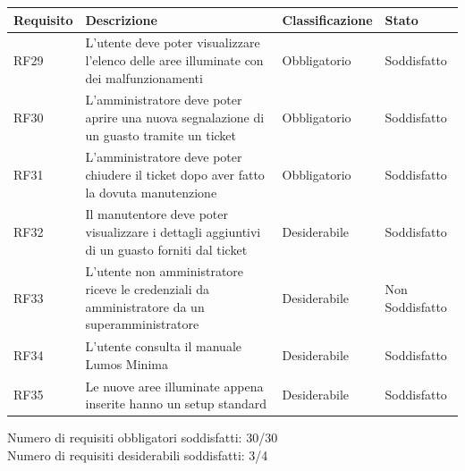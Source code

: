 \documentclass[12pt]{article}
\begin{document}
\begin{tabular}{ |p{1.8cm}|p{5.2cm}|p{2.5cm}| p{3.5cm}| }
	\hline
	Requisito& Descrizione &Classificazione & Stato \\
	\hline	
	RF29	 & L'utente deve poter visualizzare l'elenco delle aree illuminate con dei malfunzionamenti & Obbligatorio & Soddisfatto \\
	\hline				
	RF30	 & L'amministratore deve poter aprire una nuova segnalazione di un guasto tramite un ticket & Obbligatorio & Soddisfatto \\
	\hline				
	RF31	 & L'amministratore deve poter chiudere il ticket dopo aver fatto la dovuta manutenzione & Obbligatorio & Soddisfatto \\
	\hline				
	RF32	 & Il manutentore deve poter visualizzare i dettagli aggiuntivi di un guasto forniti dal ticket & Desiderabile & Soddisfatto \\
	\hline				
	RF33	 & L'utente non amministratore riceve le credenziali da amministratore da un superamministratore & Desiderabile & Non Soddisfatto \\
	\hline				
	RF34	 & L'utente consulta il manuale Lumos Minima & Desiderabile & Soddisfatto \\
	\hline				
	RF35	 & Le nuove aree illuminate appena inserite hanno un setup standard & Desiderabile & Soddisfatto \\
	\hline				
	\end{tabular}
	Numero di requisiti obbligatori soddisfatti: 30/30 \\
	Numero di requisiti desiderabili soddisfatti: 3/4 \\
\end{document}
